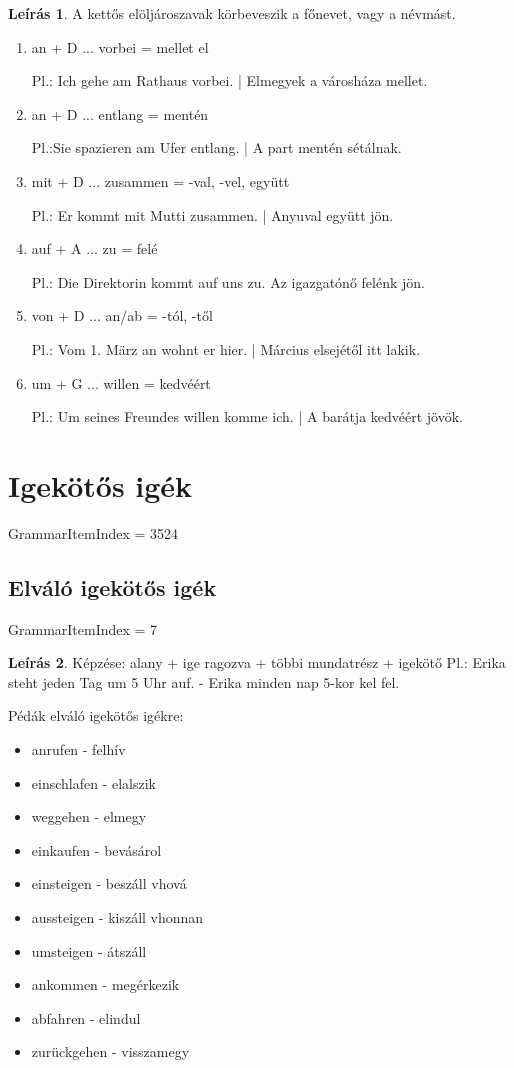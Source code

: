 \documentclass{article}
\theoremstyle{definition}
\newtheorem*{desc}{Leírás}
\begin{document}
\begin{desc}
A kettős elöljároszavak körbeveszik a főnevet, vagy a névmást.

\begin{enumerate}
\item an + D ... vorbei = mellet el

Pl.: Ich gehe am Rathaus vorbei. | Elmegyek a városháza mellet.

\item an + D ... entlang = mentén

Pl.:Sie spazieren am Ufer entlang. | A part mentén sétálnak.

\item mit + D ... zusammen = -val, -vel, együtt

Pl.: Er kommt mit Mutti zusammen. | Anyuval együtt jön.

\item auf + A ... zu = felé

Pl.: Die Direktorin kommt auf uns zu. Az igazgatónő felénk jön.

\item von + D ... an/ab = -tól, -től

Pl.: Vom 1. März an wohnt er hier. | Március elsejétől itt lakik.

\item um + G ... willen = kedvéért

Pl.: Um seines Freundes willen komme ich. | A barátja kedvéért jövök. 
\end{enumerate}
\end{desc}

\section{Igekötős igék}

GrammarItemIndex = 3524

\subsection{Elváló igekötős igék}

GrammarItemIndex = 7

\begin{desc}
Képzése: alany + ige ragozva + többi mundatrész + igekötő
Pl.: Erika steht jeden Tag um 5 Uhr auf. - Erika minden nap 5-kor kel fel.

Pédák elváló igekötős igékre:
\begin{itemize}
\item anrufen - felhív
\item einschlafen - elalszik
\item weggehen - elmegy
\item einkaufen - bevásárol
\item einsteigen - beszáll vhová
\item aussteigen - kiszáll vhonnan
\item umsteigen - átszáll
\item ankommen - megérkezik
\item abfahren - elindul
\item zurückgehen - visszamegy
\end{itemize}
\end{desc}
\end{document}
